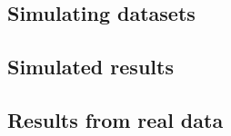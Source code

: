 \documentclass[../main.tex]{subfiles}
\begin{document}


\subsection{Simulating datasets}


\subsection{Simulated results}


\subsection{Results from real data}

\end{document}
